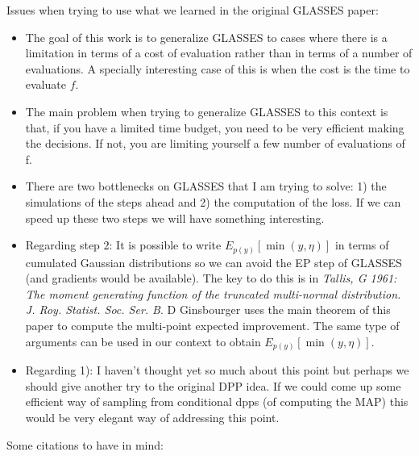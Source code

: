 \documentclass{article} %
\begin{document}
Issues when trying to use what we learned in the original GLASSES paper:

\begin{itemize}
\item The goal of this work is to generalize GLASSES to cases where there is a limitation in terms of a cost of evaluation rather than in terms of a number of evaluations. A specially interesting case of this is when the cost is the time to evaluate $f$. 
\item The main problem when trying to generalize GLASSES to this context is that, if you have a limited time budget, you need to be very efficient making the decisions. If not, you are limiting yourself a few number of evaluations of f. 
\item There are two bottlenecks on GLASSES that I am trying to solve: 1) the simulations of the steps ahead and 2) the computation of the loss. If we can speed up these two steps we will have something interesting.
\item Regarding step 2: It is possible to write $E_{p(y)} [\min (y,\eta)]$ in terms of cumulated Gaussian distributions so we can avoid the EP step of GLASSES (and gradients would be available). The key to do this is in \emph{Tallis, G 1961: The moment generating function of the truncated multi-normal distribution. J. Roy. Statist. Soc. Ser. B}. D Ginsbourger uses the main theorem of this paper to compute the multi-point expected improvement. The same type of arguments can be used in our context to obtain $E_{p(y)} [\min (y,\eta)]$. 
\item Regarding 1): I haven't thought yet so much about this point but perhaps we should give another try to the original DPP idea. If we could come up some efficient way of sampling from conditional dpps (of computing the MAP) this would be very elegant way of addressing this point.
\end{itemize}




Some citations to have in mind:

\cite{Lizotte_2008}
\cite{Jones_2001}
\cite{Snoek*Larochelle*Adams_2012}
\cite{Brochu*Cora*DeFreitas_2010}
\cite{osborne_gaussian_2009} 
\cite{Marchant*Ramos*Sanner*2014} 



\end{document}
